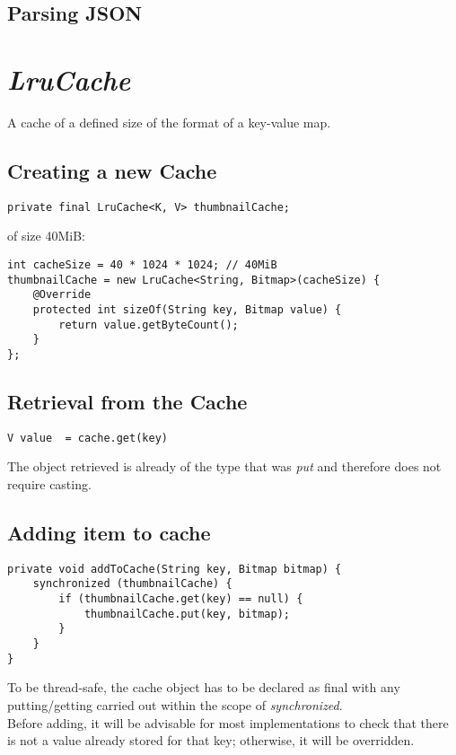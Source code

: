 \documentclass[]{article}
\renewcommand{\it}[1]{\textit{#1}}
\begin{document}
\subsection{Parsing JSON}

\section{\it{LruCache}}
A cache of a defined size of the format of a key-value map.
\subsection{Creating a new Cache}
\begin{lstlisting}
private final LruCache<K, V> thumbnailCache;
\end{lstlisting}
of size 40MiB:
\begin{lstlisting}
int cacheSize = 40 * 1024 * 1024; // 40MiB
thumbnailCache = new LruCache<String, Bitmap>(cacheSize) {
	@Override
	protected int sizeOf(String key, Bitmap value) {
		return value.getByteCount();
	}
};
\end{lstlisting}

\subsection{Retrieval from the Cache}
\begin{lstlisting}
V value  = cache.get(key)
\end{lstlisting}
The object retrieved is already of the type that was \it{put} and therefore does not require casting.

\subsection{Adding item to cache}
\begin{lstlisting}
private void addToCache(String key, Bitmap bitmap) {
	synchronized (thumbnailCache) {
		if (thumbnailCache.get(key) == null) {
			thumbnailCache.put(key, bitmap);
		}
	}
}
\end{lstlisting}
To be thread-safe, the cache object has to be declared as final with any putting/getting carried out within the scope of \it{synchronized}.
\\
Before adding, it will be advisable for most implementations to check that there is not a value already stored for that key; otherwise, it will be overridden.

\end{document}
